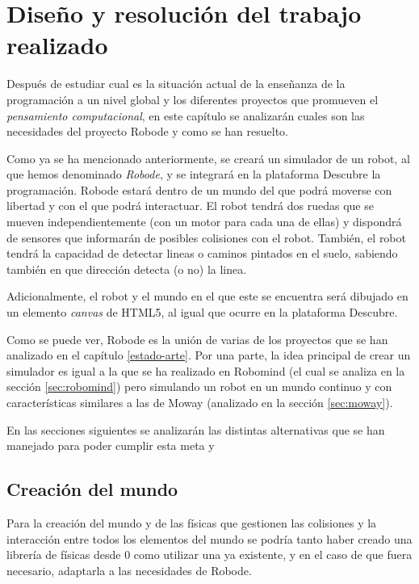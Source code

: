 \chapter{Diseño y resolución del trabajo realizado}
\label{diseno}

Después de estudiar cual es la situación actual de la enseñanza de la programación a un nivel global y los diferentes proyectos que promueven el \emph{pensamiento computacional}, en este capítulo se analizarán cuales son las necesidades del proyecto Robode y como se han resuelto.

Como ya se ha mencionado anteriormente, se creará un simulador de un robot, al que hemos denominado \emph{Robode}, y se integrará en la plataforma Descubre la programación. Robode  estará dentro de un mundo del que podrá moverse con libertad y con el que podrá interactuar. El robot tendrá dos ruedas que se mueven independientemente (con un motor para cada una de ellas) y dispondrá de sensores que informarán de posibles colisiones con el robot. También, el robot tendrá la capacidad de detectar lineas o caminos pintados en el suelo, sabiendo también en que dirección detecta (o no) la linea.

Adicionalmente, el robot y el mundo en el que este se encuentra será dibujado en un elemento \emph{canvas} de HTML5, al igual que ocurre en la plataforma Descubre.

{\color{red}
Como se puede ver, Robode es la unión de varias de los proyectos que se han analizado en el capítulo \ref{estado-arte}. Por una parte, la idea principal de crear un simulador es igual a la que se ha realizado en Robomind (el cual se analiza en la sección \ref{sec:robomind}) pero simulando un robot en un mundo continuo y con características similares a las de Moway (analizado en la sección \ref{sec:moway}).
}





En las secciones siguientes se analizarán las distintas alternativas que se han manejado para poder cumplir esta meta y 


\section{Creación del mundo}
\label{sec:mundo}


Para la creación del mundo y de las físicas que gestionen las colisiones y la interacción entre todos los elementos del mundo se podría tanto haber creado una librería de físicas desde 0 como utilizar una ya existente, y en el caso de que fuera necesario, adaptarla a las necesidades de Robode. 


